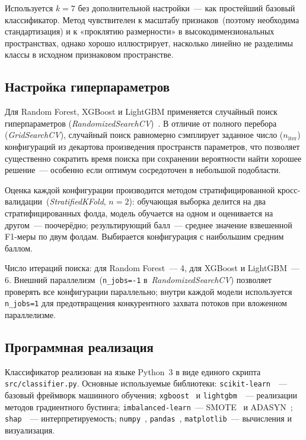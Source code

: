 Используется $k=7$ без дополнительной настройки~--- как простейший базовый классификатор. Метод чувствителен к масштабу признаков~(поэтому необходима стандартизация) и к «проклятию размерности» в высокодимензиональных пространствах, однако хорошо иллюстрирует, насколько линейно не разделимы классы в исходном признаковом пространстве.

\subsection{Настройка гиперпараметров}

Для Random Forest, XGBoost и LightGBM применяется случайный поиск гиперпараметров (\textit{RandomizedSearchCV})~\cite{scikit_learn}. В отличие от полного перебора (\textit{GridSearchCV}), случайный поиск равномерно сэмплирует заданное число ($n_{\text{iter}}$) конфигураций из декартова произведения пространств параметров, что позволяет существенно сократить время поиска при сохранении вероятности найти хорошее решение~--- особенно если оптимум сосредоточен в небольшой подобласти.

Оценка каждой конфигурации производится методом стратифицированной кросс-валидации~(\textit{StratifiedKFold}, $n=2$): обучающая выборка делится на два стратифицированных фолда, модель обучается на одном и оценивается на другом~--- поочерёдно; результирующий балл~--- среднее значение взвешенной F1-меры по двум фолдам. Выбирается конфигурация с наибольшим средним баллом.

Число итераций поиска: для Random Forest~--- 4, для XGBoost и LightGBM~--- 6. Внешний параллелизм~(\texttt{n\_jobs=-1} в~\textit{RandomizedSearchCV}) позволяет проверять все конфигурации параллельно; внутри каждой модели используется \texttt{n\_jobs=1} для предотвращения конкурентного захвата потоков при вложенном параллелизме.

\subsection{Программная реализация}

Классификатор реализован на языке Python~3 в виде единого скрипта \texttt{src/classifier.py}. Основные используемые библиотеки: \texttt{scikit-learn}~\cite{scikit_learn}~--- базовый фреймворк машинного обучения; \texttt{xgboost}~\cite{xgboost_paper} и \texttt{lightgbm}~\cite{lightgbm_paper}~--- реализации методов градиентного бустинга; \texttt{imbalanced-learn}~--- SMOTE~\cite{smote_paper} и ADASYN~\cite{adasyn_paper}; \texttt{shap}~\cite{shap_paper}~--- интерпретируемость; \texttt{numpy}~\cite{numpy_guide}, \texttt{pandas}~\cite{pandas_guide}, \texttt{matplotlib}~--- вычисления и визуализация.

